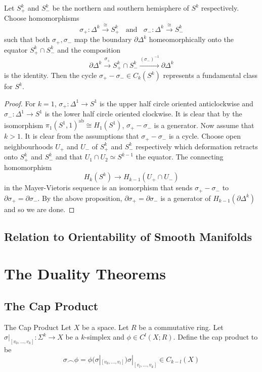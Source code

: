 \documentclass[a4paper]{article}
\begin{document}
\begin{crl}{}{} Let $S_+^k$ and $S_-^k$ be the northern and southern hemisphere of $S^k$ respectively. Choose homomorphisms $$\sigma_+:\Delta^k\overset{\cong}{\longrightarrow} S_+^k\;\;\text{ and }\;\;\sigma_-:\Delta^k\overset{\cong}{\longrightarrow} S_-^k$$ such that both $\sigma_+,\sigma_-$ map the boundary $\partial\Delta^k$ homeomorphically onto the equator $S_+^k\cap S_-^k$ and the composition $$\partial\Delta^k\overset{\sigma_+}{\longrightarrow}S_+^k\cap S_-^k\overset{(\sigma_-)^{-1}}{\longrightarrow}\partial\Delta^k$$ is the identity. Then the cycle $\sigma_+-\sigma_-\in C_k(S^k)$ represents a fundamental class for $S^k$. \tcbline
\begin{proof}
For $k=1$, $\sigma_+:\Delta^1\to S^1$ is the upper half circle oriented anticlockwise and $\sigma_-:\Delta^1\to S^1$ is the lower half circle oriented clockwise. It is clear that by the isomorphism $\pi_1(S^1,1)^\text{ab}\cong H_1(S^1)$, $\sigma_+-\sigma_-$ is a generator. Now assume that $k>1$. It is clear from the assumptions that $\sigma_+-\sigma_-$ is a cycle. Choose open neighbourhoods $U_+$ and $U_-$ of $S_+^k$ and $S_-^k$ respectively which deformation retracts onto $S_+^k$ and $S_-^k$ and that $U_1\cap U_2\simeq S^{k-1}$ the equator. The connecting homomorphism $$H_k(S^k)\to H_{k-1}(U_+\cap U_-)$$ in the Mayer-Vietoris sequence is an isomorphism that sends $\sigma_+-\sigma_-$ to $\partial\sigma_+=\partial\sigma_-$. By the above proposition, $\partial\sigma_+=\partial\sigma_-$ is a generator of $H_{k-1}(\partial\Delta^k)$ and so we are done. 
\end{proof}
\end{crl}


\subsection{Relation to Orientability of Smooth Manifolds}

\pagebreak
\section{The Duality Theorems}
\subsection{The Cap Product}
\begin{defn}{The Cap Product}{} Let $X$ be a space. Let $R$ be a commutative ring. Let $\sigma|_[v_0,\dots,v_k]:\Sigma^k\to X$ be a $k$-simplex and $\phi\in C^l(X;R)$. Define the cap product to be $$\sigma\frown\phi=\phi(\sigma|_{[v_0,\dots,v_l]})\sigma|_{[v_l,\dots,v_k]}\in C_{k-l}(X)$$
\end{defn}
\end{document}
